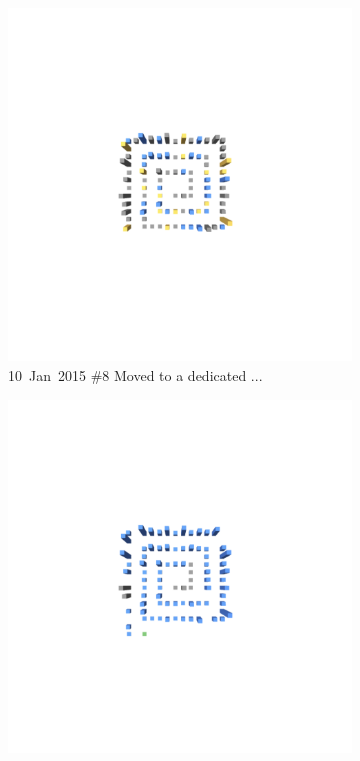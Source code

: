 \begin{figure}[ht]
\begin{subfigure}{0.32\textwidth}
        \includegraphics[width=\linewidth]{JetUML_V0S4.png}
        \caption{\mbox{10 Jan 2015}  \hfill  \linebreak  \#8 Moved to a dedicated ...} 
        \label{fig:JetUML_V0S4}
    \end{subfigure}
    \hspace*{\fill}
    \begin{subfigure}{0.32\textwidth}
        \includegraphics[width=\linewidth]{JetUML_V0S5.png}

\end{subfigure}
\end{figure}
